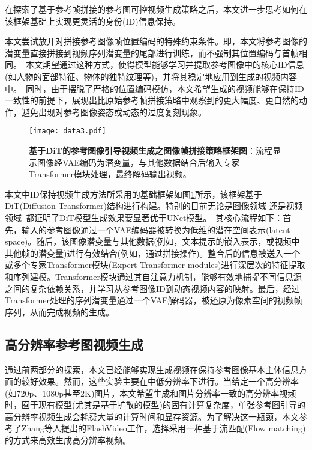 在探索了基于参考帧拼接的参考图可控视频生成策略之后，本文进一步思考如何在该框架基础上实现更灵活的身份(ID)信息保持。

本文尝试放开对拼接参考图像帧位置编码的特殊约束条件。即，本文将参考图像的潜变量直接拼接到视频序列潜变量的尾部进行训练，而不强制其位置编码与首帧相同。\
本文期望通过这种方式，使得模型能够学习并提取参考图像中的核心ID信息(如人物的面部特征、物体的独特纹理等)，并将其稳定地应用到生成的视频内容中。\
同时，由于摆脱了严格的位置编码模仿，本文希望生成的视频能够在保持ID一致性的前提下，展现出比原始参考帧拼接策略中观察到的更大幅度、更自然的动作，避免出现对参考图像姿态或动态的过度复刻现象。
\begin{figure}[H]
    \centering
    \texttt{[image: data3.pdf]}
    \caption{\textbf{基于DiT的参考图像引导视频生成之图像帧拼接策略框架图}：流程显示图像经VAE编码为潜变量，与其他数据结合后输入专家Transformer模块处理，最终解码输出视频。}
    \label{architecture1}
\end{figure}
本文中ID保持视频生成方法所采用的基础框架如图\ref{architecture1}所示，该框架基于DiT(Diffusion Transformer)结构进行构建。特别的目前无论是图像领域\cite{peebles2023scalable,chen2023pixart} 还是视频领域~\cite{hong2022cogvideo, yang2024cogvideox, kong2024hunyuanvideo, lin2024open}都证明了DiT模型生成效果要显著优于UNet模型。\
其核心流程如下：首先，输入的参考图像通过一个VAE编码器被转换为低维的潜在空间表示(latent space)。随后，该图像潜变量与其他数据(例如，文本提示的嵌入表示，或视频中其他帧的潜变量)进行有效结合(例如，通过拼接操作)。整合后的信息被送入一个或多个专家Transformer模块(Expert Transformer modules)进行深层次的特征提取和序列建模。Transformer模块通过其自注意力机制，能够有效地捕捉不同信息源之间的复杂依赖关系，并学习从参考图像ID到动态视频内容的映射。最后，经过Transformer处理的序列潜变量通过一个VAE解码器，被还原为像素空间的视频帧序列，从而完成视频的生成。


\subsection{高分辨率参考图视频生成}
通过前两部分的探索，本文已经能够实现生成视频在保持参考图像基本主体信息方面的较好效果。然而，这些实验主要在中低分辨率下进行。当给定一个高分辨率(如720p、1080p甚至2K)图片，本文希望生成和图片分辨率一致的高分辨率视频时，囿于现有模型(尤其是基于扩散的模型)的固有计算复杂度，单张参考图引导的高分辨率视频生成会耗费大量的计算时间和显存资源。为了解决这一瓶颈，本文参考了Zhang等人提出的FlashVideo\cite{zhang2025flashvideo}工作，选择采用一种基于流匹配(Flow matching)的方式来高效生成高分辨率视频。

